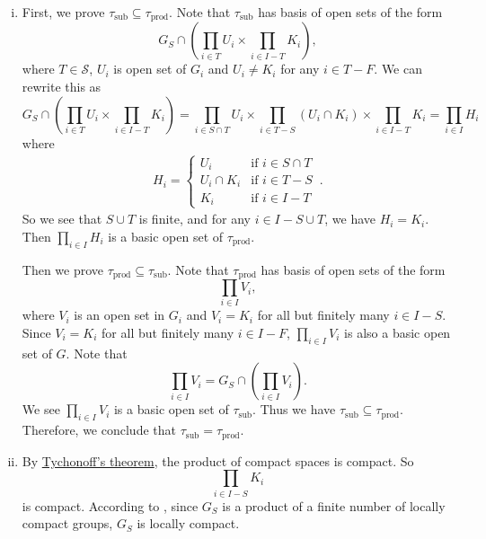 \documentclass{report}
\begin{document}
\begin{prf}
	\begin{enumerate}[(i)]
		\item First, we prove $\tau_{\mathrm{sub}} \subseteq \tau_{\mathrm{prod}}$. Note that $\tau_{\mathrm{sub}}$ has basis of open sets of the form
	\[	
	G_S\cap \left(\prod_{i\in T} U_i \times \prod_{i\in I-T} K_i\right),
	\]
    where $T\in\mathcal S$, $U_i$ is open set of $G_i$ and $U_i\ne K_i$ for any $i\in T-F$. We can rewrite this as
	\[
	G_S\cap \left(\prod_{i\in T} U_i \times \prod_{i\in I-T} K_i\right)=\prod_{i\in S\cap T} U_i\times \prod_{i\in T - S} (U_i\cap K_i)\times \prod_{i\in I- T} K_i=\prod_{i\in I} H_i
	\]
	where
	\begin{align*}
		H_i=\begin{cases}
			U_i & \text{if } i\in S\cap T\\
			U_i\cap K_i & \text{if } i\in T-S\\
			K_i & \text{if } i\in I-T
		\end{cases}\,.
	\end{align*}
	So we see that $S\cup T$ is finite, and for any $i\in I-S\cup T$, we have $H_i = K_i$. Then $\prod_{i\in I} H_i$ is a basic open set of  $\tau_{\mathrm{prod}}$.

	Then we prove $\tau_{\mathrm{prod}} \subseteq \tau_{\mathrm{sub}}$. Note that $\tau_{\mathrm{prod}}$ has basis of open sets of the form
	\[
	\prod_{i\in I} V_i,
	\]
	where $V_i$ is an open set in $G_i$ and $V_i = K_i$ for all but finitely many $i \in I-S$. Since $V_i = K_i$ for all but finitely many $i \in I-F$, $\prod_{i\in I} V_i$ is also a basic open set of $G$. Note that 
	\[
	\prod_{i\in I} V_i=G_S\cap\left(\prod_{i\in I} V_i\right).
	\]
    We see $\prod_{i\in I} V_i$ is a basic open set of $\tau_{\mathrm{sub}}$. Thus we have $\tau_{\mathrm{sub}} \subseteq \tau_{\mathrm{prod}}$. Therefore, we conclude that $\tau_{\mathrm{sub}} = \tau_{\mathrm{prod}}$.
	\item By \hyperref[th:sufficient_condition_for_compactness]{Tychonoff's theorem}, the product of compact spaces is compact. So 
	\[
	 \prod_{i\in I-S} K_i
	\]
	is compact. According to , since $G_S$ is a product of a finite number of locally compact groups, $G_S$ is locally compact.
	\end{enumerate}
	
\end{prf}
\end{document}
